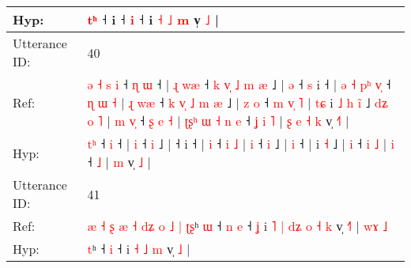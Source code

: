 \documentclass[10pt]{article}
\DeclareRobustCommand{\hl}[1]{{\textcolor{red}{#1}}}
\begin{document}
\begin{longtable}{ll}
 \\
Hyp: & \hl{}\hl{t}\hl{ʰ} ˧\hl{}\hl{}\hl{}\hl{}\hl{}\hl{}\hl{}\hl{}\hl{} i\hl{}\hl{}\hl{}\hl{}\hl{}\hl{}\hl{}\hl{}\hl{}\hl{}\hl{}\hl{}\hl{}\hl{}\hl{}\hl{}\hl{}\hl{}\hl{}\hl{}\hl{}\hl{}\hl{}\hl{}\hl{}\hl{}\hl{}\hl{}\hl{}\hl{}\hl{}\hl{} ˧\hl{}\hl{} \hl{i} ˧\hl{}\hl{} i\hl{}\hl{}\hl{}\hl{}\hl{}\hl{} \hl{˧} \hl{˩} \hl{m} v̩ \hl{}\hl{˩} |
 \\
\midrule
Utterance ID: & 40 \\
Ref: & \hl{ə}\hl{ }\hl{˧}\hl{ }\hl{s}\hl{ }\hl{i} ˧\hl{ }\hl{ɳ} \hl{ɯ} ˧ |\hl{ }\hl{ɻ} \hl{w}\hl{æ} ˧\hl{ }\hl{k}\hl{ }\hl{v}\hl{̩}\hl{ }\hl{˩}\hl{ }\hl{m} \hl{æ} ˩ |\hl{ }\hl{ə} ˧\hl{ }\hl{s} i ˧ |\hl{ }\hl{ə}\hl{ }\hl{˧}\hl{ }\hl{p}\hl{ʰ} \hl{v}\hl{̩} ˧\hl{ }\hl{ɳ} \hl{ɯ} \hl{˧} |\hl{ }\hl{ɻ} \hl{w}\hl{æ} ˧\hl{ }\hl{k}\hl{ }\hl{v}\hl{̩}\hl{ }\hl{˩}\hl{ }\hl{m} \hl{æ} ˩ |\hl{ }\hl{z} \hl{o} ˧\hl{ }\hl{m}\hl{ }\hl{v}\hl{̩}\hl{ }\hl{˥} |\hl{ }\hl{t}\hl{ɕ} i\hl{ }\hl{˩}\hl{ }\hl{h} \hl{i}\hl{̃} ˩\hl{ }\hl{d}\hl{ʑ}\hl{ }\hl{o}\hl{ }\hl{˥} |\hl{ }\hl{m} \hl{v}\hl{̩} ˧\hl{ }\hl{ʂ} \hl{e} \hl{˧} |\hl{ }\hl{ʈ}\hl{ʂ}\hl{ʰ}\hl{ }\hl{ɯ}\hl{ }\hl{˧}\hl{ }\hl{n} \hl{e} ˧\hl{ }\hl{ʝ}\hl{ }\hl{i} \hl{˥} |\hl{ }\hl{ʂ}\hl{ }\hl{e}\hl{ }\hl{˧} \hl{k} v̩ \hl{˧}\hl{˥} |
 \\
Hyp: & \hl{}\hl{}\hl{}\hl{}\hl{}\hl{t}\hl{ʰ} ˧\hl{}\hl{} \hl{i} ˧ |\hl{}\hl{} \hl{}\hl{i} ˧\hl{}\hl{}\hl{}\hl{}\hl{}\hl{}\hl{}\hl{}\hl{} \hl{i} ˩ |\hl{}\hl{} ˧\hl{}\hl{} i ˧ |\hl{}\hl{}\hl{}\hl{}\hl{}\hl{}\hl{} \hl{}\hl{i} ˧\hl{}\hl{} \hl{i} \hl{˩} |\hl{}\hl{} \hl{}\hl{i} ˧\hl{}\hl{}\hl{}\hl{}\hl{}\hl{}\hl{}\hl{}\hl{} \hl{i} ˩ |\hl{}\hl{} \hl{i} ˧\hl{}\hl{}\hl{}\hl{}\hl{}\hl{}\hl{} |\hl{}\hl{}\hl{} i\hl{}\hl{}\hl{}\hl{} \hl{}\hl{˧} ˩\hl{}\hl{}\hl{}\hl{}\hl{}\hl{}\hl{} |\hl{}\hl{} \hl{}\hl{i} ˧\hl{}\hl{} \hl{i} \hl{˩} |\hl{}\hl{}\hl{}\hl{}\hl{}\hl{}\hl{}\hl{}\hl{}\hl{} \hl{i} ˧\hl{}\hl{}\hl{}\hl{} \hl{˩} |\hl{}\hl{}\hl{}\hl{}\hl{}\hl{} \hl{m} v̩ \hl{}\hl{˩} |
 \\
\midrule
Utterance ID: & 41 \\
Ref: & \hl{æ}\hl{ }\hl{˧}\hl{ }\hl{ʂ}\hl{ }\hl{æ}\hl{ }\hl{˧}\hl{ }\hl{d}\hl{ʑ}\hl{ }\hl{o}\hl{ }\hl{˩}\hl{ }\hl{|}\hl{ }\hl{ʈ}\hl{ʂ}ʰ\hl{ }\hl{ɯ} ˧\hl{ }\hl{n} \hl{e} ˧\hl{ }\hl{ʝ} i\hl{ }\hl{˥}\hl{ }\hl{|}\hl{ }\hl{d}\hl{ʑ} \hl{o} \hl{˧} \hl{k} v̩ \hl{˧}\hl{˥} |\hl{ }\hl{w}\hl{ɤ}\hl{ }\hl{˩}
 \\
Hyp: & \hl{}\hl{}\hl{}\hl{}\hl{}\hl{}\hl{}\hl{}\hl{}\hl{}\hl{}\hl{}\hl{}\hl{}\hl{}\hl{}\hl{}\hl{}\hl{}\hl{}\hl{t}ʰ\hl{}\hl{} ˧\hl{}\hl{} \hl{i} ˧\hl{}\hl{} i\hl{}\hl{}\hl{}\hl{}\hl{}\hl{}\hl{} \hl{˧} \hl{˩} \hl{m} v̩ \hl{}\hl{˩} |\hl{}\hl{}\hl{}\hl{}\hl{}
 \\
\midrule
\end{longtable}
\end{document}
